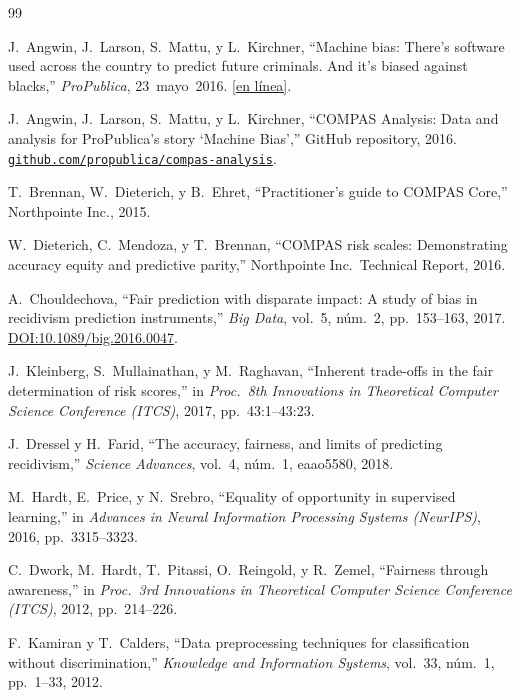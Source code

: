 \documentclass[11pt,a4paper]{article}
\begin{document}
\begin{thebibliography}{99}

J.~Angwin, J.~Larson, S.~Mattu, y L.~Kirchner,
``Machine bias: There's software used across the country to predict future criminals. And it's biased against blacks,''
\textit{ProPublica}, 23~mayo~2016.
\href{https://www.propublica.org/article/machine-bias-risk-assessments-in-criminal-sentencing}{[en l\'inea]}.

J.~Angwin, J.~Larson, S.~Mattu, y L.~Kirchner,
``COMPAS Analysis: Data and analysis for ProPublica's story `Machine Bias','' GitHub repository, 2016.
\href{https://github.com/propublica/compas-analysis}{\texttt{github.com/propublica/compas-analysis}}.

T.~Brennan, W.~Dieterich, y B.~Ehret,
``Practitioner's guide to COMPAS Core,''
Northpointe Inc., 2015.

W.~Dieterich, C.~Mendoza, y T.~Brennan,
``COMPAS risk scales: Demonstrating accuracy equity and predictive parity,''
Northpointe Inc.\ Technical Report, 2016.

A.~Chouldechova,
``Fair prediction with disparate impact: A study of bias in recidivism prediction instruments,''
\textit{Big Data}, vol.~5, núm.~2, pp.~153--163, 2017.
\href{https://doi.org/10.1089/big.2016.0047}{DOI:10.1089/big.2016.0047}.

J.~Kleinberg, S.~Mullainathan, y M.~Raghavan,
``Inherent trade-offs in the fair determination of risk scores,''
in \textit{Proc.\ 8th Innovations in Theoretical Computer Science Conference (ITCS)}, 2017, pp.~43:1--43:23.

J.~Dressel y H.~Farid,
``The accuracy, fairness, and limits of predicting recidivism,''
\textit{Science Advances}, vol.~4, núm.~1, eaao5580, 2018.

M.~Hardt, E.~Price, y N.~Srebro,
``Equality of opportunity in supervised learning,''
in \textit{Advances in Neural Information Processing Systems (NeurIPS)}, 2016, pp.~3315--3323.

C.~Dwork, M.~Hardt, T.~Pitassi, O.~Reingold, y R.~Zemel,
``Fairness through awareness,''
in \textit{Proc.\ 3rd Innovations in Theoretical Computer Science Conference (ITCS)}, 2012, pp.~214--226.

F.~Kamiran y T.~Calders,
``Data preprocessing techniques for classification without discrimination,''
\textit{Knowledge and Information Systems}, vol.~33, núm.~1, pp.~1--33, 2012.


\end{thebibliography}
\end{document}
